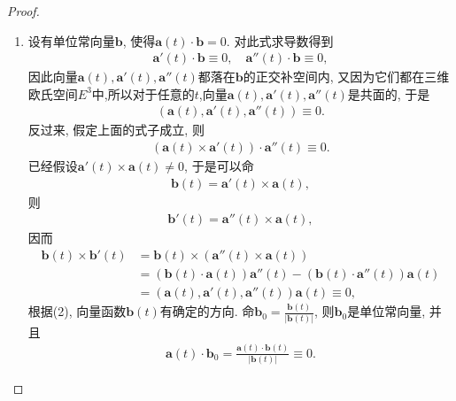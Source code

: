 \documentclass[../../main.tex]{subfiles}%
\begin{document}
\begin{proof}
\begin{enumerate}[(1)]
\item 设有单位常向量$\bm{b}$, 使得$\bm{a}(t)\cdot\bm{b}=0$. 对此式求导数得到
\begin{align*}
\bm{a}'(t)\cdot\bm{b}\equiv 0,\quad \bm{a}''(t)\cdot\bm{b}\equiv 0,
\end{align*}
因此向量$\bm{a}(t),\bm{a}'(t),\bm{a}''(t)$都落在$\bm{b}$的正交补空间内, 又因为它们都在三维欧氏空间$E^3$中,所以对于任意的$t$,向量$\bm{a}(t),\bm{a}'(t),\bm{a}''(t)$是共面的, 于是
\begin{align*}
(\bm{a}(t),\bm{a}'(t),\bm{a}''(t))\equiv 0.
\end{align*}
反过来, 假定上面的式子成立, 则
\begin{align*}
(\bm{a}(t)\times\bm{a}'(t))\cdot\bm{a}''(t)\equiv 0.
\end{align*}
已经假设$\bm{a}'(t)\times\bm{a}(t)\neq 0$, 于是可以命
\begin{align*}
\bm{b}(t) = \bm{a}'(t)\times\bm{a}(t),
\end{align*}
则
\begin{align*}
\bm{b}'(t) = \bm{a}''(t)\times\bm{a}(t),
\end{align*}
因而
\begin{align*}
\bm{b}(t)\times\bm{b}'(t) &= \bm{b}(t)\times(\bm{a}''(t)\times\bm{a}(t)) \\
&= (\bm{b}(t)\cdot\bm{a}(t))\bm{a}''(t) - (\bm{b}(t)\cdot\bm{a}''(t))\bm{a}(t) \\
&= (\bm{a}(t),\bm{a}'(t),\bm{a}''(t))\bm{a}(t)\equiv 0,
\end{align*}
根据(2), 向量函数$\bm{b}(t)$有确定的方向. 命$\bm{b}_0 = \frac{\boldsymbol{b}\left( t \right)}{\left| \boldsymbol{b}\left( t \right) \right|}$, 则$\bm{b}_0$是单位常向量, 并且
\begin{align*}
\bm{a}(t)\cdot\bm{b}_0 = \frac{\bm{a}(t)\cdot\bm{b}(t)}{|\bm{b}(t)|}\equiv 0.
\end{align*}
\end{enumerate}

\end{proof}
\end{document}
